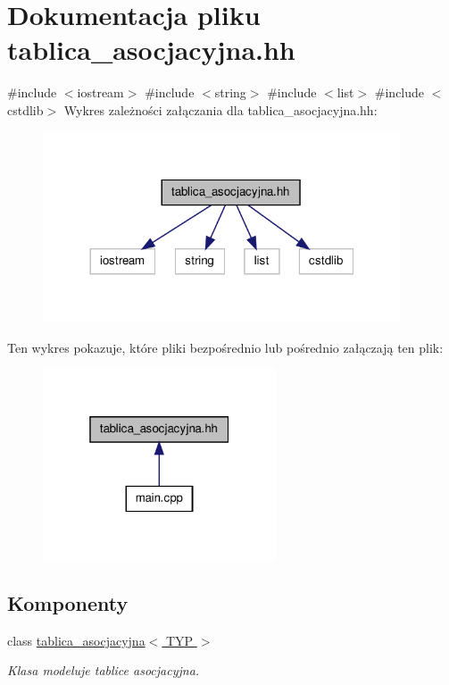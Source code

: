 \hypertarget{tablica__asocjacyjna_8hh}{\section{\-Dokumentacja pliku tablica\-\_\-asocjacyjna.\-hh}
\label{tablica__asocjacyjna_8hh}
}
{\ttfamily \#include $<$iostream$>$}\*
{\ttfamily \#include $<$string$>$}\*
{\ttfamily \#include $<$list$>$}\*
{\ttfamily \#include $<$cstdlib$>$}\*
\-Wykres zależności załączania dla tablica\-\_\-asocjacyjna.\-hh\-:
\nopagebreak
\begin{figure}[H]
\begin{center}
\leavevmode
\includegraphics[width=300pt]{tablica__asocjacyjna_8hh__incl}
\end{center}
\end{figure}
\-Ten wykres pokazuje, które pliki bezpośrednio lub pośrednio załączają ten plik\-:
\nopagebreak
\begin{figure}[H]
\begin{center}
\leavevmode
\includegraphics[width=196pt]{tablica__asocjacyjna_8hh__dep__incl}
\end{center}
\end{figure}
\subsection*{\-Komponenty}
\begin{DoxyCompactItemize}
\item 
class \hyperlink{classtablica__asocjacyjna}{tablica\-\_\-asocjacyjna$<$ T\-Y\-P $>$}
\begin{DoxyCompactList}\small\item\em \-Klasa modeluje tablice asocjacyjna. \end{DoxyCompactList}\end{DoxyCompactItemize}

